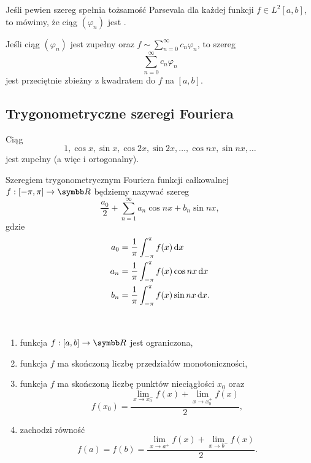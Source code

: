 Jeśli pewien szereg spełnia tożsamość Parsevala dla każdej funkcji $f \in L^2[a, b]$, to mówimy, że ciąg $(\varphi_n)$ jest .

\begin{corollary}
    Jeśli ciąg $(\varphi_n)$ jest zupełny oraz $f \sim \sum_{n=0}^\infty c_n\varphi_n$, to szereg
    \[ \sum_{n=0}^\infty c_n\varphi_n \]
    jest przeciętnie zbieżny z kwadratem do $f$ na $[a, b]$.
\end{corollary}

\subsection{Trygonometryczne szeregi Fouriera}
\begin{fact}
    Ciąg
    \[ 1, \cos x, \sin x, \cos 2x, \sin 2x, \ldots, \cos nx, \sin nx, \ldots \]
    jest zupełny (a więc i ortogonalny).
\end{fact}

\begin{corollary}
    \label{c:Euler-Fourier for trig}
    Szeregiem trygonometrycznym Fouriera funkcji całkowalnej $f : [-\pi, \pi] \to \RR$ będziemy nazywać szereg
    \[ \frac{a_0}{2} + \sum_{n=1}^\infty a_n\cos nx + b_n\sin nx, \]
    gdzie
    \begin{align*}
        a_0 &= \frac{1}{\pi}\int_{-\pi}^\pi f(x) \operatorname{d}\!{x} \\
        a_n &= \frac{1}{\pi}\int_{-\pi}^\pi f(x)\cos nx \operatorname{d}\!{x} \\
        b_n &= \frac{1}{\pi}\int_{-\pi}^\pi f(x)\sin nx \operatorname{d}\!{x}.
    \end{align*}
\end{corollary}

\begin{definition} ~
    \begin{enumerate}
        \item funkcja $f : [a, b] \to \RR$ jest ograniczona,
        \item funkcja $f$ ma skończoną liczbę przedziałów monotoniczności,
        \item funkcja $f$ ma skończoną liczbę punktów nieciągłości $x_0$ oraz
        \[ f(x_0) = \frac{\lim\limits_{x\to x_0^-}f(x) + \lim\limits_{x\to x_0^+}f(x)}{2}, \]
        \item zachodzi równość
        \[ f(a) = f(b) = \frac{\lim\limits_{x\to a^+}f(x) + \lim\limits_{x\to b^-}f(x)}{2}. \]
    \end{enumerate}
\end{definition}

